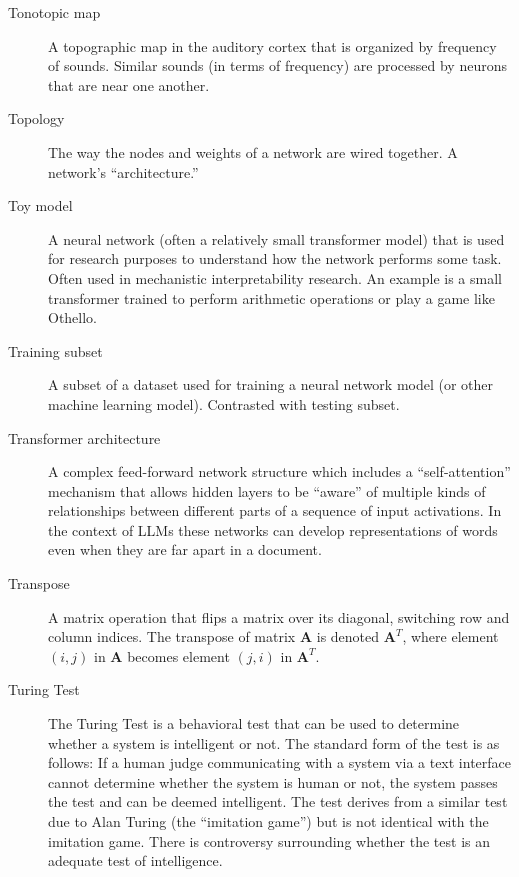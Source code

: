 \begin{description}
\item[Tonotopic map] A topographic map in the auditory cortex that is organized by frequency of sounds. Similar sounds (in terms of frequency) are processed by neurons that are near one another.

\item[Topology] The way the nodes and weights of a network are wired together. A network's ``architecture.''

\item[Toy model] A neural network (often a relatively small transformer model) that is used for research purposes to understand how the network performs some task. Often used in mechanistic interpretability research. An example is a small transformer trained to perform arithmetic operations or play a game like Othello.

\item[Training subset] A subset of a dataset used for training a neural network model (or other machine learning model). Contrasted with testing subset.

\item[Transformer architecture] A complex feed-forward network structure which includes a ``self-attention'' mechanism that allows hidden layers to be ``aware'' of multiple kinds of relationships between different parts of a sequence of input activations. In the context of LLMs these networks can develop representations of words even when they are far apart in a document.

\item[Transpose] A matrix operation that flips a matrix over its diagonal, switching row and column indices. The transpose of matrix $\textbf{A}$ is denoted $\textbf{A}^T$, where element $(i,j)$ in $\textbf{A}$ becomes element $(j,i)$ in $\textbf{A}^T$.


\item[Turing Test] The Turing Test is a behavioral test that can be used to determine whether a system is intelligent or not. The standard form of the test is as follows: If a human judge communicating with a system via a text interface cannot determine whether the system is human or not, the system passes the test and can be deemed intelligent.  The test derives from a similar test due to Alan Turing (the ``imitation game'') but is not identical with the imitation game. There is controversy surrounding whether the test is an adequate test of intelligence.


\end{description}
